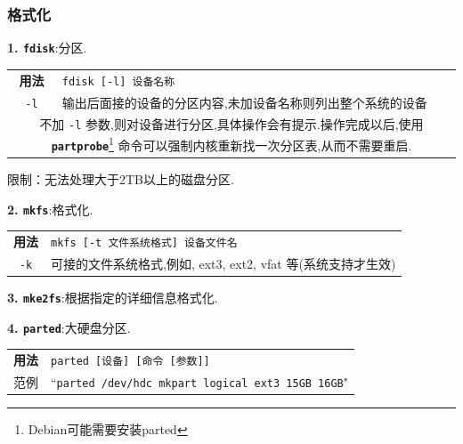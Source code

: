 \subsubsection{格式化}
\par
\textbf{1. \texttt{fdisk}}:分区.
\begin{longtable}{c@{: }p{}}\hline\hline

    \textbf{用法} & \verb"fdisk [-l] 设备名称"
    \\

    \texttt{-l}  & 输出后面接的设备的分区内容,未加设备名称则列出整个系统的设备  \\

    \multicolumn{2}{p{\columnwidth}}{不加 \texttt{-l} 参数,则对设备进行分区,具体操作会有提示.操作完成以后,使用 \textbf{\texttt{partprobe}}\footnote[1]{Debian可能需要安装parted} 命令可以强制内核重新找一次分区表,从而不需要重启.} \\

    \hline
\end{longtable}
限制：无法处理大于2TB以上的磁盘分区.

\textbf{2. \texttt{mkfs}}:格式化.
\begin{longtable}{c@{: }p{}}\hline\hline

    \textbf{用法} & \verb"mkfs [-t 文件系统格式] 设备文件名"
    \\

    \texttt{-k}  & 可接的文件系统格式,例如, ext3, ext2, vfat 等(系统支持才生效)  \\

    \hline
\end{longtable}

\textbf{3. \texttt{mke2fs}}:根据指定的详细信息格式化.

\textbf{4. \texttt{parted}}:大硬盘分区.
\begin{longtable}{c@{: }p{}}\hline\hline

    \textbf{用法} & \verb"parted [设备] [命令 [参数]]"
    \\

    范例  & ``\texttt{parted /dev/hdc mkpart logical ext3 15GB 16GB}" \\

    \hline
\end{longtable}


